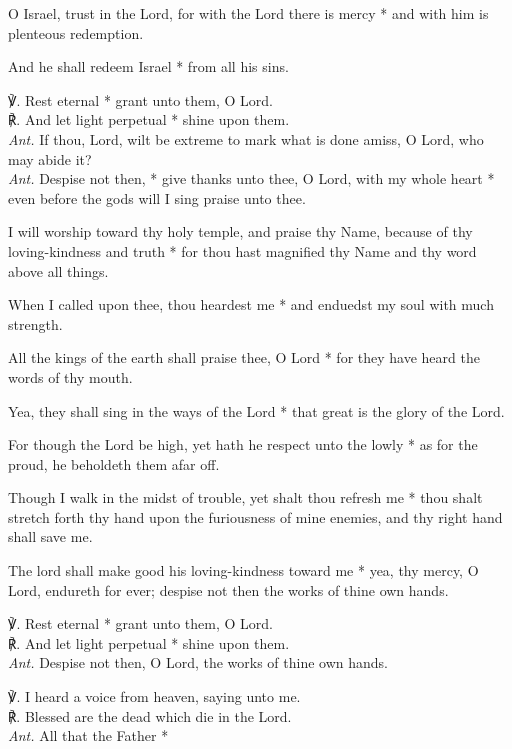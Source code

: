 \par
O Israel, trust in the Lord, for with the Lord there is mercy * and with him is plenteous redemption.
\par
And he shall redeem Israel * from all his sins.\\
\par\noindent
℣. Rest eternal * grant unto them, O Lord.\\
℟. And let light perpetual * shine upon them.\\
\textit{Ant.} If thou, Lord, wilt be extreme to mark what is done amiss, O Lord, who may abide it?\\
\textit{Ant.} Despise not then, *
 give thanks unto thee, O Lord, with my whole heart * even before the gods will I sing praise unto thee.
\par
I will worship toward thy holy temple, and praise thy Name, because of thy loving-kindness and truth * for thou hast magnified thy Name and thy word above all things.
\par
When I called upon thee, thou heardest me * and enduedst my soul with much strength.
\par
All the kings of the earth shall praise thee, O Lord * for they have heard the words of thy mouth.
\par
Yea, they shall sing in the ways of the Lord * that great is the glory of the Lord.
\par
For though the Lord be high, yet hath he respect unto the lowly * as for the proud, he beholdeth them afar off.
\par
Though I walk in the midst of trouble, yet shalt thou refresh me * thou shalt stretch forth thy hand upon the furiousness of mine enemies, and thy right hand shall save me.
\par
The lord shall make good his loving-kindness toward me * yea, thy mercy, O Lord, endureth for ever; despise not then the works of thine own hands.\\
\par\noindent
℣. Rest eternal * grant unto them, O Lord.\\
℟. And let light perpetual * shine upon them.\\
\textit{Ant.} Despise not then, O Lord, the works of thine own hands.\\
\par\noindent
℣. I heard a voice from heaven, saying unto me.\\
℟. Blessed are the dead which die in the Lord.\\
\textit{Ant.} All that the Father *

